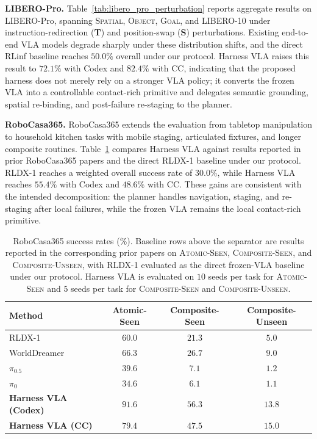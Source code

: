 \documentclass{article}
\begin{document}
\textbf{LIBERO-Pro.} Table~\ref{tab:libero_pro_perturbation} reports aggregate results on LIBERO-Pro, spanning \textsc{Spatial}, \textsc{Object}, \textsc{Goal}, and \textsc{LIBERO-10} under instruction-redirection (\textbf{T}) and position-swap (\textbf{S}) perturbations. Existing end-to-end VLA models degrade sharply under these distribution shifts, and the direct RLinf baseline reaches $50.0\%$ overall under our protocol. Harness VLA raises this result to $72.1\%$ with Codex and $82.4\%$ with CC, indicating that the proposed harness does not merely rely on a stronger VLA policy; it converts the frozen VLA into a controllable contact-rich primitive and delegates semantic grounding, spatial re-binding, and post-failure re-staging to the planner.


\textbf{RoboCasa365.} RoboCasa365 extends the evaluation from tabletop manipulation to household kitchen tasks with mobile staging, articulated fixtures, and longer composite routines. Table~\ref{tab:robocasa_main} compares Harness VLA against results reported in prior RoboCasa365 papers and the direct RLDX-1 baseline under our protocol. RLDX-1 reaches a weighted overall success rate of $30.0\%$, while Harness VLA reaches $55.4\%$ with Codex and $48.6\%$ with CC. These gains are consistent with the intended decomposition: the planner handles navigation, staging, and re-staging after local failures, while the frozen VLA remains the local contact-rich primitive.

\begin{table}[htbp]
\centering
\caption{RoboCasa365 success rates (\%). Baseline rows above the separator are results reported in the corresponding prior papers on \textsc{Atomic-Seen}, \textsc{Composite-Seen}, and \textsc{Composite-Unseen}, with RLDX-1 evaluated as the direct frozen-VLA baseline under our protocol. Harness VLA is evaluated on $10$ seeds per task for \textsc{Atomic-Seen} and $5$ seeds per task for \textsc{Composite-Seen} and \textsc{Composite-Unseen}.}
\label{tab:robocasa_main}
\small
\setlength{\tabcolsep}{7pt}
\begin{tabular}{l ccc}
\toprule
Method & Atomic-Seen & Composite-Seen & Composite-Unseen \\
\midrule
RLDX-1~\citep{kim2026rldx} & $60.0$ & $21.3$ & $5.0$ \\
WorldDreamer~\citep{wang2024worlddreamer} & $66.3$ & $26.7$ & $9.0$ \\
$\pi_{0.5}$~\citep{black2025pi05} & $39.6$ & $7.1$ & $1.2$ \\
$\pi_0$~\citep{black2025pi0} & $34.6$ & $6.1$ & $1.1$ \\
\midrule
\textbf{Harness VLA (Codex)} & $\mathbf{91.6}$ & $\mathbf{56.3}$ & $13.8$ \\
\textbf{Harness VLA (CC)} & $79.4$ & $47.5$ & $\mathbf{15.0}$ \\
\bottomrule
\end{tabular}
\end{table}
\end{document}
